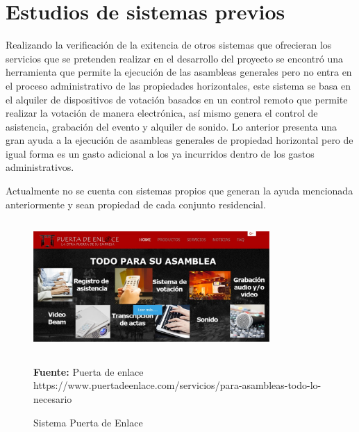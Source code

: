 \newpage


\section{Estudios de sistemas previos}

Realizando la verificación de la exitencia de otros sistemas que ofrecieran los servicios que se pretenden realizar en el desarrollo del proyecto se encontró una herramienta que permite la ejecución de las asambleas generales pero no entra en el proceso administrativo de las propiedades horizontales, este sistema se basa en el alquiler de dispositivos de votación basados en un control remoto que permite realizar la votación de manera electrónica, así mismo genera el control de asistencia, grabación del evento y alquiler de sonido. Lo anterior presenta una gran ayuda a la ejecución de asambleas generales de propiedad horizontal pero de igual forma es un gasto adicional a los ya incurridos dentro de los gastos administrativos.

Actualmente no se cuenta con sistemas propios que generan la ayuda mencionada anteriormente y sean propiedad de cada conjunto residencial.

\vspace{1.5cm}

\begin{figure}[th!]
	\centering
	\includegraphics[width=9cm,height=5cm]{contexto/proyecto/imgs/puerta_enlace.jpg}
	\caption{Sistema Puerta de Enlace}{\scriptsize \textbf{Fuente:} Puerta de enlace  https://www.puertadeenlace.com/servicios/para-asambleas-todo-lo-necesario}
\end{figure}

\newpage